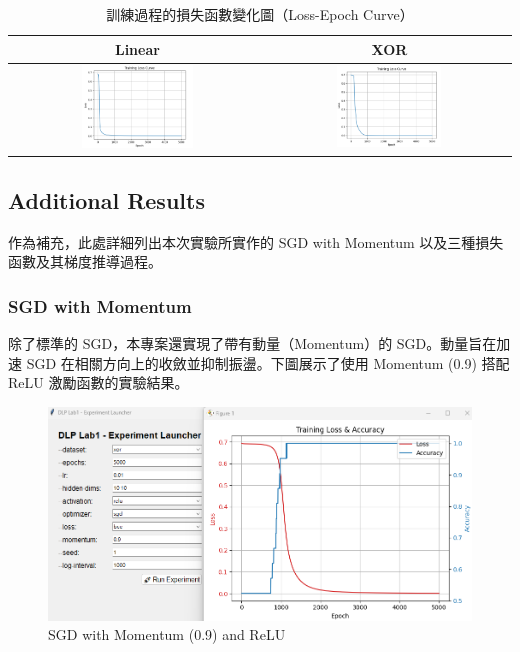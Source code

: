 \documentclass{article}
\begin{document}
\begin{table}[h!]
    \centering
    \caption{訓練過程的損失函數變化圖（Loss-Epoch Curve）}
    \label{fig:loss_curve}
    \begin{tabular}{|c|c|}
        \hline
        \textbf{Linear} & \textbf{XOR} \\
        \hline
        \includegraphics[width=0.45\textwidth]{Lab01_report/img/3.3-linear.png} &
        \includegraphics[width=0.45\textwidth]{Lab01_report/img/3.3-xor.png} \\
        \hline
    \end{tabular}
\end{table}

\subsection{Additional Results}
作為補充，此處詳細列出本次實驗所實作的 SGD with Momentum 以及三種損失函數及其梯度推導過程。

\subsubsection{SGD with Momentum}
除了標準的 SGD，本專案還實現了帶有動量（Momentum）的 SGD。動量旨在加速 SGD 在相關方向上的收斂並抑制振盪。下圖展示了使用 Momentum (0.9) 搭配 ReLU 激勵函數的實驗結果。

\begin{figure}[h!]
    \centering
    \includegraphics[width=1\textwidth]{Lab01_report/img/3.4.png}
    \caption{SGD with Momentum (0.9) and ReLU}
    \label{fig:momentum_result}
\end{figure}
\end{document}
